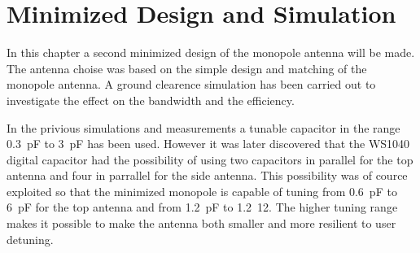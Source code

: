\chapter{Minimized Design and Simulation}
\label{cha_intro_5mm}
In this chapter a second minimized design of the monopole antenna will be made.
The antenna choise was based on the simple design and matching of the monopole antenna.
A ground clearence simulation has been carried out to investigate the effect on the bandwidth and the efficiency.

In the privious simulations and measurements a tunable capacitor in the range \SI{0.3}{pF} to \SI{3}{pF} has been used. However it was later discovered that the WS1040 digital capacitor had the possibility of using two capacitors in parallel for the top antenna and four in parrallel for the side antenna. This possibility was of cource exploited so that the minimized monopole is capable of tuning from \SI{0.6}{pF} to \SI{6}{pF} for the top antenna and from \SI{1.2}{pF} to \SI{1.2}{12}. The higher tuning range makes it possible to make the antenna both smaller and more resilient to user detuning.
